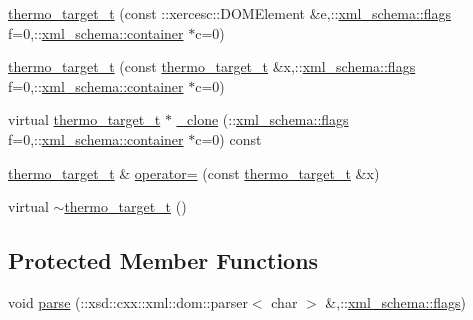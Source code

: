 \begin{DoxyCompactItemize}
\item 
\hyperlink{classthermo__target__t_a9ac3b10f9c5654e81cba5276195c38a1}{thermo\+\_\+target\+\_\+t} (const \+::xercesc\+::\+D\+O\+M\+Element \&e,\+::\hyperlink{namespacexml__schema_a0612287d030cb2732d31a45b258fdc87}{xml\+\_\+schema\+::flags} f=0,\+::\hyperlink{namespacexml__schema_ada9aa30dc722e93ee2ed7243085402a5}{xml\+\_\+schema\+::container} $\ast$c=0)
\item 
\hyperlink{classthermo__target__t_ab7e1761c001576d9a8d487b0915338ee}{thermo\+\_\+target\+\_\+t} (const \hyperlink{classthermo__target__t}{thermo\+\_\+target\+\_\+t} \&x,\+::\hyperlink{namespacexml__schema_a0612287d030cb2732d31a45b258fdc87}{xml\+\_\+schema\+::flags} f=0,\+::\hyperlink{namespacexml__schema_ada9aa30dc722e93ee2ed7243085402a5}{xml\+\_\+schema\+::container} $\ast$c=0)
\item 
virtual \hyperlink{classthermo__target__t}{thermo\+\_\+target\+\_\+t} $\ast$ \hyperlink{classthermo__target__t_a64435f0073ad5d34d8dfc411aa4265c8}{\+\_\+clone} (\+::\hyperlink{namespacexml__schema_a0612287d030cb2732d31a45b258fdc87}{xml\+\_\+schema\+::flags} f=0,\+::\hyperlink{namespacexml__schema_ada9aa30dc722e93ee2ed7243085402a5}{xml\+\_\+schema\+::container} $\ast$c=0) const 
\item 
\hyperlink{classthermo__target__t}{thermo\+\_\+target\+\_\+t} \& \hyperlink{classthermo__target__t_a4ffeef051a75bb6d023099a12b1408f6}{operator=} (const \hyperlink{classthermo__target__t}{thermo\+\_\+target\+\_\+t} \&x)
\item 
virtual \hyperlink{classthermo__target__t_a06ce95a53b9c37b180f2d64d40232d5a}{$\sim$thermo\+\_\+target\+\_\+t} ()
\end{DoxyCompactItemize}
\subsection*{Protected Member Functions}
\begin{DoxyCompactItemize}
\item 
void \hyperlink{classthermo__target__t_a68070ef530b1a354dade413fba7f1711}{parse} (\+::xsd\+::cxx\+::xml\+::dom\+::parser$<$ char $>$ \&,\+::\hyperlink{namespacexml__schema_a0612287d030cb2732d31a45b258fdc87}{xml\+\_\+schema\+::flags})
\end{DoxyCompactItemize}
